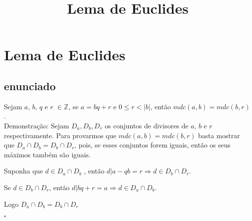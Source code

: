 \documentclass[12pt]{article}
\title{Lema de Euclides}
\begin{document}
\section{Lema de Euclides}
\subsection{enunciado}
Sejam $a$, $b$, $q$ e $r$ $\in \mathbb{Z}$, se $a=bq+r$ e $0\leq r < |b|$, então $mdc(a,b)=mdc(b,r)$. $$ $$
Demonstração:
Sejam $D_{a}, D_{b}, D_{r}$ os conjuntos de divisores de $a$, $b$ e $r$ respectivamente. Para provarmos que $mdc(a,b)=mdc(b,r)$ basta mostrar que $D_{a} \cap D_{b} = D_{b} \cap D_{r}$, pois, se esses conjuntos forem iguais, então os seus máximos também são iguais. 

Suponha que $d \in D_{a} \cap D_{b}$ , então $d \vert a-qb=r \Rightarrow d \in D_{b} \cap D_{r}$.

Se $d \in D_{b} \cap D_{r}$, então $d \vert bq+r=a \Rightarrow d \in D_{a} \cap D_{b}$.

Logo $D_{a} \cap D_{b} = D_{b} \cap D_{r}$ 

$\square$
\end{document}

